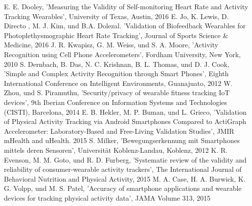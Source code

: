 \documentclass[conference]{IEEEtran}
\begin{document}
\begin{thebibliography}{00}
 E. E. Dooley, 'Measuring the Validity of Self-monitoring Heart Rate and Activity Tracking Wearables', University of Texas, Austin, 2016
 E. Jo, K. Lewis, D. Directo , M. J.  Kim, und B.A. Dolezal. 'Validation of Biofeedback Wearables for Photoplethysmographic Heart Rate Tracking', Journal of Sports Science \& Medicine, 2016
 J. R. Kwapisz, G. M. Weiss, und S. A. Moore, 'Activity Recognition using Cell Phone Accelerometers', Fordham University, New York, 2010
 S. Dernbach, B. Das, N. C. Krishnan, B. L. Thomas, und D. J. Cook, 'Simple and Complex Activity Recognition through Smart Phones', Eighth International Conference on Intelligent Environments, Guanajuato, 2012
 W. Zhou, und S. Piramuthu, 'Security/privacy of wearable fitness tracking IoT devices', 9th Iberian Conference on Information Systems and Technologies (CISTI), Barcelona, 2014
 E. B. Hekler, M. P. Buman, und L. Grieco, 'Validation of Physical Activity Tracking via Android Smartphones Compared to ActiGraph Accelerometer: Laboratory-Based and Free-Living Validation Studies', JMIR mHealth and uHealth. 2015
 S. Milker, 'Bewegungserkennung mit Smartphones mittels deren Sensoren', Universität Koblenz-Landau, Koblenz, 2012
 K. R. Evenson, M. M. Goto, und R. D. Furberg, 'Systematic review of the validity and reliability of consumer-wearable activity trackers', The International Journal of Behavioral Nutrition and Physical Activity, 2015
 M. A. Case, H. A. Burwick, K. G. Volpp, und M. S. Patel, 'Accuracy of smartphone applications and wearable devices for tracking physical activity data', JAMA Volume 313, 2015
\end{thebibliography}
\end{document}
